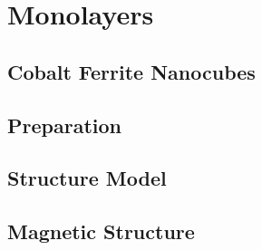 \documentclass[\main/dresen_thesis.tex]{subfiles}
\renewcommand{\thisPath}{\main/chapters/monolayers}
\begin{document}
  \chapter{Monolayers}\label{ch:monolayers}
    

    \section{Cobalt Ferrite Nanocubes}
      

    \FloatBarrier
    \clearpage
    \section{Preparation}
      

    \FloatBarrier
    \clearpage
    \section{Structure Model}
      

    \FloatBarrier
    \section{Magnetic Structure}
      
\end{document}

